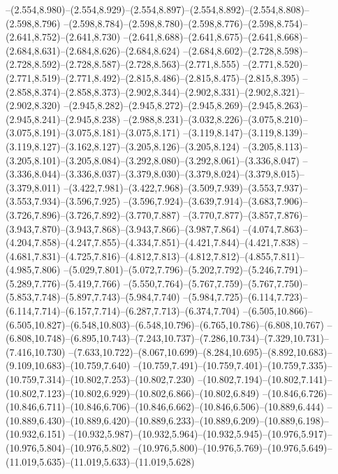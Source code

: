   --(2.554,8.980)--(2.554,8.929)--(2.554,8.897)--(2.554,8.892)--(2.554,8.808)--(2.598,8.796)%
  --(2.598,8.784)--(2.598,8.780)--(2.598,8.776)--(2.598,8.754)--(2.641,8.752)--(2.641,8.730)%
  --(2.641,8.688)--(2.641,8.675)--(2.641,8.668)--(2.684,8.631)--(2.684,8.626)--(2.684,8.624)%
  --(2.684,8.602)--(2.728,8.598)--(2.728,8.592)--(2.728,8.587)--(2.728,8.563)--(2.771,8.555)%
  --(2.771,8.520)--(2.771,8.519)--(2.771,8.492)--(2.815,8.486)--(2.815,8.475)--(2.815,8.395)%
  --(2.858,8.374)--(2.858,8.373)--(2.902,8.344)--(2.902,8.331)--(2.902,8.321)--(2.902,8.320)%
  --(2.945,8.282)--(2.945,8.272)--(2.945,8.269)--(2.945,8.263)--(2.945,8.241)--(2.945,8.238)%
  --(2.988,8.231)--(3.032,8.226)--(3.075,8.210)--(3.075,8.191)--(3.075,8.181)--(3.075,8.171)%
  --(3.119,8.147)--(3.119,8.139)--(3.119,8.127)--(3.162,8.127)--(3.205,8.126)--(3.205,8.124)%
  --(3.205,8.113)--(3.205,8.101)--(3.205,8.084)--(3.292,8.080)--(3.292,8.061)--(3.336,8.047)%
  --(3.336,8.044)--(3.336,8.037)--(3.379,8.030)--(3.379,8.024)--(3.379,8.015)--(3.379,8.011)%
  --(3.422,7.981)--(3.422,7.968)--(3.509,7.939)--(3.553,7.937)--(3.553,7.934)--(3.596,7.925)%
  --(3.596,7.924)--(3.639,7.914)--(3.683,7.906)--(3.726,7.896)--(3.726,7.892)--(3.770,7.887)%
  --(3.770,7.877)--(3.857,7.876)--(3.943,7.870)--(3.943,7.868)--(3.943,7.866)--(3.987,7.864)%
  --(4.074,7.863)--(4.204,7.858)--(4.247,7.855)--(4.334,7.851)--(4.421,7.844)--(4.421,7.838)%
  --(4.681,7.831)--(4.725,7.816)--(4.812,7.813)--(4.812,7.812)--(4.855,7.811)--(4.985,7.806)%
  --(5.029,7.801)--(5.072,7.796)--(5.202,7.792)--(5.246,7.791)--(5.289,7.776)--(5.419,7.766)%
  --(5.550,7.764)--(5.767,7.759)--(5.767,7.750)--(5.853,7.748)--(5.897,7.743)--(5.984,7.740)%
  --(5.984,7.725)--(6.114,7.723)--(6.114,7.714)--(6.157,7.714)--(6.287,7.713)--(6.374,7.704)%
  --(6.505,10.866)--(6.505,10.827)--(6.548,10.803)--(6.548,10.796)--(6.765,10.786)--(6.808,10.767)%
  --(6.808,10.748)--(6.895,10.743)--(7.243,10.737)--(7.286,10.734)--(7.329,10.731)--(7.416,10.730)%
  --(7.633,10.722)--(8.067,10.699)--(8.284,10.695)--(8.892,10.683)--(9.109,10.683)--(10.759,7.640)%
  --(10.759,7.491)--(10.759,7.401)--(10.759,7.335)--(10.759,7.314)--(10.802,7.253)--(10.802,7.230)%
  --(10.802,7.194)--(10.802,7.141)--(10.802,7.123)--(10.802,6.929)--(10.802,6.866)--(10.802,6.849)%
  --(10.846,6.726)--(10.846,6.711)--(10.846,6.706)--(10.846,6.662)--(10.846,6.506)--(10.889,6.444)%
  --(10.889,6.430)--(10.889,6.420)--(10.889,6.233)--(10.889,6.209)--(10.889,6.198)--(10.932,6.151)%
  --(10.932,5.987)--(10.932,5.964)--(10.932,5.945)--(10.976,5.917)--(10.976,5.804)--(10.976,5.802)%
  --(10.976,5.800)--(10.976,5.769)--(10.976,5.649)--(11.019,5.635)--(11.019,5.633)--(11.019,5.628)%
